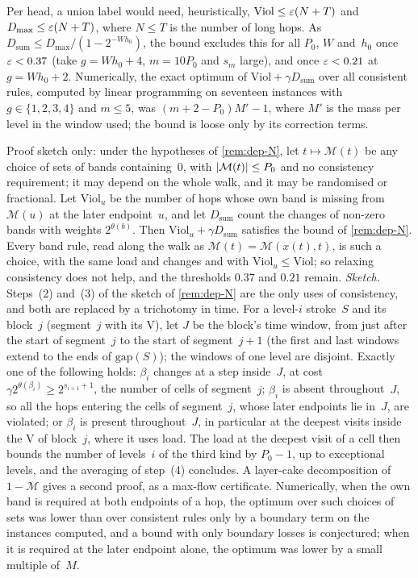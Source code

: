 \begin{remark}
Per head, a union label would need, heuristically, $\mathrm{Viol}\le\varepsilon(N+T)$ and $D_{\max}\le\varepsilon(N+T)$, where $N\le T$ is the number of
long hops. As $D_{\mathrm{sum}}\le D_{\max}/(1-2^{-Wh_0})$, the bound excludes this for all $P_0$, $W$ and~$h_0$ once
$\varepsilon<0.37$ (take $g=Wh_0+4$, $m=10P_0$ and $s_m$ large), and once $\varepsilon<0.21$ at $g=Wh_0+2$. Numerically, the exact
optimum of $\mathrm{Viol}+\gamma D_{\mathrm{sum}}$ over all consistent rules, computed by linear programming on
seventeen instances with $g\in\{1,2,3,4\}$ and $m\le5$, was $(m+2-P_0)M'-1$, where $M'$ is the mass per level in the
window used; the bound is loose only by its correction terms.
\end{remark}

\begin{remark}\label{rem:dep-Nprime}
Proof sketch only: under the hypotheses of \cref{rem:dep-N}, let $t\mapsto\mathcal M(t)$ be any choice of sets of bands
containing~$0$, with $\lvert \mathcal M(t) \rvert\le P_0$ and no consistency requirement; it may depend on the whole walk, and
it may be randomised or fractional. Let $\mathrm{Viol}_u$ be the number of hops whose own band is missing from
$\mathcal M(u)$ at the later endpoint~$u$, and let $D_{\mathrm{sum}}$ count the changes of non-zero bands with weights
$2^{\theta(b)}$. Then $\mathrm{Viol}_u+\gamma D_{\mathrm{sum}}$ satisfies the bound of \cref{rem:dep-N}. Every band rule,
read along the walk as $\mathcal M(t)=\mathcal M(x(t),t)$, is such a choice, with the same load and changes and with
$\mathrm{Viol}_u\le\mathrm{Viol}$; so relaxing consistency does not help, and the thresholds $0.37$ and $0.21$ remain.
\emph{Sketch.} Steps~(2) and~(3) of the sketch of \cref{rem:dep-N} are the only uses of consistency, and both are replaced
by a trichotomy in time. For a level-$i$ stroke~$S$ and its block~$j$ (segment~$j$ with its V), let $J$ be the
block's time window, from just after the start of segment~$j$ to the start of segment~$j+1$ (the first and last
windows extend to the ends of $\mathrm{gap}(S)$); the windows of one level are disjoint. Exactly one of the following
holds: $\beta_i$ changes at a step inside~$J$, at cost $\gamma2^{\theta(\beta_i)}\ge2^{s_{i+1}+1}$, the number of
cells of segment~$j$; $\beta_i$ is absent throughout~$J$, so all the hops entering the cells of segment~$j$, whose
later endpoints lie in~$J$, are violated; or $\beta_i$ is present throughout~$J$, in particular at the deepest visits
inside the V of block~$j$, where it uses load. The load at the deepest visit of a cell then bounds the number of
levels~$i$ of the third kind by $P_0-1$, up to exceptional levels, and the averaging of step~(4) concludes. A
layer-cake decomposition of $1-\mathcal M$ gives a second proof, as a max-flow certificate. Numerically, when the own
band is required at both endpoints of a hop, the optimum over such choices of sets was lower than over consistent
rules only by a boundary term on the instances computed, and a bound with only boundary losses is conjectured; when it
is required at the later endpoint alone, the optimum was lower by a small multiple of~$M$.
\end{remark}


